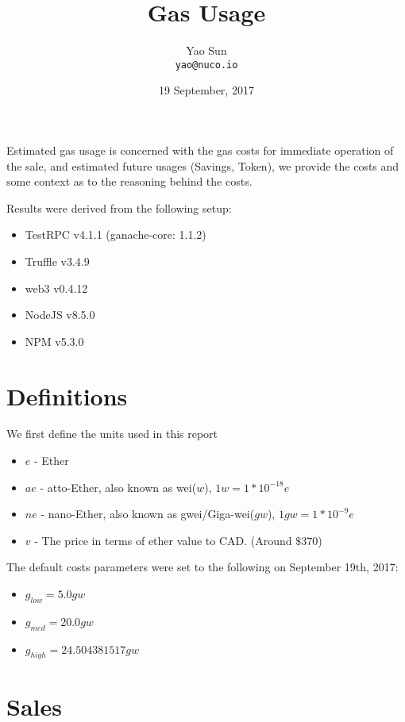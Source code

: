 \documentclass[a4paper,english]{article}
\title{Gas Usage}
\author{Yao Sun\\
  \small{\texttt{yao@nuco.io}}
}
\date{19 September, 2017}
\begin{document}
\maketitle

Estimated gas usage is concerned with the gas costs for immediate operation of the sale, and estimated future usages (Savings, Token), we provide the costs and some context as to the reasoning behind the costs.

Results were derived from the following setup:

\begin{itemize}
  \item TestRPC v4.1.1 (ganache-core: 1.1.2)
  \item Truffle v3.4.9
  \item web3 v0.4.12
  \item NodeJS v8.5.0
  \item NPM v5.3.0
\end{itemize}

\section{Definitions}

We first define the units used in this report

\begin{itemize}
  \item $e$ - Ether
  \item $ae$ - atto-Ether, also known as wei($w$), $1w = 1 * 10^{-18}e$
  \item $ne$ - nano-Ether, also known as gwei/Giga-wei($gw$), $1gw = 1 * 10^{-9}e$
  \item $v$ - The price in terms of ether value to CAD. (Around $\$370$)
\end{itemize}

The default costs parameters were set to the following on September 19th, 2017:

\begin{itemize}
  \item $g_{low} = 5.0 gw$
  \item $g_{med} = 20.0 gw$
  \item $g_{high} = 24.504381517 gw$
\end{itemize}

\section{Sales}
\end{document}
